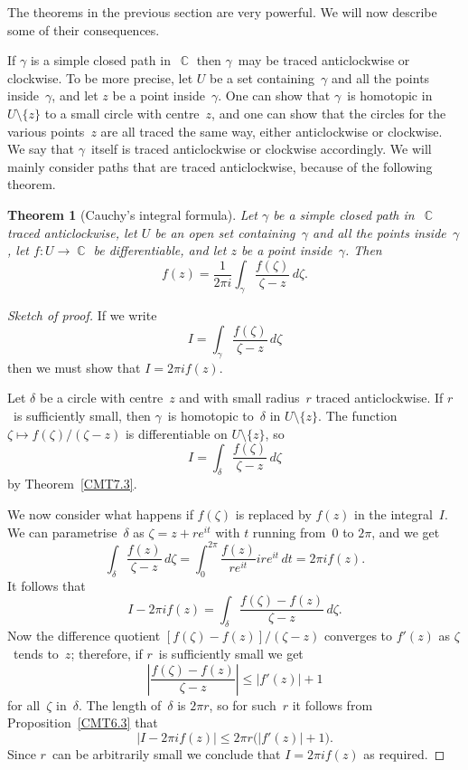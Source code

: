 \documentclass{amsproc}
\newtheorem{theorem}{Theorem}[subsection]
\theoremstyle{definition}
\theoremstyle{remark}
\DeclareMathOperator{\C}{\mathbb{C}}
\numberwithin{equation}{section}
\begin{document}
The theorems in the previous section are very powerful. We will now describe some of their consequences.

If $ \gamma $ is a simple closed path in~$ \C $ then $ \gamma $~may be traced anticlockwise or clockwise. To be more precise, let $ U $ be a set containing~$ \gamma $ and all
the points inside~$ \gamma $, and let $ z $ be a point inside~$ \gamma $. One can show that $ \gamma $~is homotopic in $ U \setminus \{z\} $ to a small circle with centre~$ z $,
and one can show that the circles for the various points~$ z $ are all traced the same way, either anticlockwise or clockwise. We say that $ \gamma $~itself is traced anticlockwise
or clockwise accordingly. We will mainly consider paths that are traced anticlockwise, because of the following theorem.

\begin{theorem}[Cauchy's integral formula] \label{CMT8.1}
Let $ \gamma $ be a simple closed path in~$ \C $ traced anticlockwise, let $ U $ be an open set containing~$ \gamma $ and all the points inside~$ \gamma $, let $ f: U \to \C $ be differentiable, and let $ z $ be a point inside~$ \gamma $. Then
$$
f(z) = \dfrac{1}{2\pi i} \int_\gamma \dfrac{f(\zeta)}{\zeta - z}\,d\zeta.
$$
\end{theorem}

\begin{proof}[Sketch of proof]
If we write
$$
I = \int_\gamma \dfrac{f(\zeta)}{\zeta - z}\,d\zeta
$$
then we must show that $ I = 2\pi i f(z) $.

Let $ \delta $ be a circle with centre~$ z $ and with small radius~$ r $ traced anticlockwise. If $ r $~is sufficiently small, then $ \gamma $~is homotopic to~$ \delta $
in $ U \setminus \{z\} $. The function $ \zeta \mapsto f(\zeta)/(\zeta - z) $ is differentiable on $ U \setminus \{z\} $, so
$$
I = \int_\delta \dfrac{f(\zeta)}{\zeta - z}\,d\zeta
$$
by Theorem~\ref{CMT7.3}.

We now consider what happens if $ f(\zeta) $ is replaced by $ f(z) $ in the integral~$ I $. We can parametrise~$ \delta $ as $ \zeta = z + re^{it} $ with $ t $ running
from~$ 0 $ to $ 2\pi $, and we get
$$
\int_{\delta} \dfrac{f(z)}{\zeta - z}\,d\zeta = \int_0^{2\pi} \dfrac{f(z)}{re^{it}}ire^{it}\,dt = 2\pi if(z).
$$
It follows that
$$
I - 2\pi i f(z) = \int_\delta \dfrac{f(\zeta) - f(z)}{\zeta - z}\,d\zeta.
$$
Now the difference quotient $ [f(\zeta) - f(z)]/(\zeta - z) $ converges to $ f'(z) $ as $ \zeta $~tends to~$ z $; therefore, if $ r $~is sufficiently small we get
$$
\left|\dfrac{f(\zeta) - f(z)}{\zeta - z}\right| \leq |f'(z)| + 1
$$
for all~$ \zeta $ in~$ \delta $. The length of~$ \delta $ is $ 2\pi r $, so for such~$ r $ it follows from Proposition~\ref{CMT6.3} that
$$
|I - 2\pi i f(z)| \leq 2 \pi r\bigl(|f'(z)| + 1\bigr).
$$
Since $ r $~can be arbitrarily small we conclude that $ I = 2 \pi i f(z) $ as required.
\end{proof}
\end{document}
